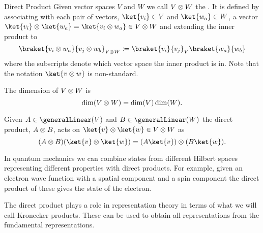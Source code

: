 \begin{dfn}{Direct Product}{}
    Given vector spaces \(V\) and \(W\) we call \(V \otimes W\) the .
    It is defined by associating with each pair of vectors, \(\ket{v_i} \in V\) and \(\ket{w_a} \in W\), a vector \(\ket{v_i} \directproduct \ket{w_a} = \ket{v_i \directproduct w_a} \in V \directproduct W\) and extending the inner product to
    \begin{equation}
        \braket{v_i \directproduct w_a}{v_j \directproduct w_b}_{V\directproduct W} \coloneqq \braket{v_i}{v_j}_{V}\braket{w_a}{w_b}
    \end{equation}
    where the subscripts denote which vector space the inner product is in.
    Note that the notation \(\ket{v\directproduct w}\) is non-standard.
    
    The dimension of \(V\otimes W\) is
    \begin{equation}
        \dim(V\otimes W) = \dim(V) \dim(W).
    \end{equation}
    
    Given \(A \in \generalLinear(V)\) and \(B \in \generalLinear(W)\) the direct product, \(A \otimes B\), acts on \(\ket{v}\directproduct \ket{w} \in V\directproduct W\) as
    \begin{equation}
        (A\directproduct B)(\ket{v}\directproduct \ket{w}) = (A\ket{v})\directproduct(B\ket{w}).
    \end{equation}
\end{dfn}

\begin{app}{}{}
    In quantum mechanics we can combine states from different Hilbert spaces representing different properties with direct products.
    For example, given an electron wave function with a spatial component and a spin component the direct product of these gives the state of the electron.
\end{app}

The direct product plays a role in representation theory in terms of what we will call Kronecker products.
These can be used to obtain all representations from the fundamental representations.